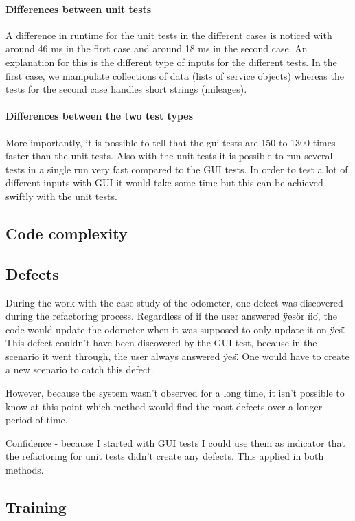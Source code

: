 \documentclass{article}
\begin{document}
			\paragraph{Differences between unit tests}
			A difference in runtime for the unit tests in the different cases is noticed with around 46 ms in the first case and around 18 ms in the second case. An explanation for this is the different type of inputs for the different tests. In the first case, we manipulate collections of data (lists of service objects) whereas the tests for the second case handles short strings (mileages).

			\paragraph{Differences between the two test types}			
			More importantly, it is possible to tell that the gui tests are 150 to 1300 times faster than the unit tests. Also with the unit tests it is possible to run several tests in a single run very fast compared to the GUI tests. In order to test a lot of different inputs with GUI it would take some time but this can be achieved swiftly with the unit tests.

		\subsection{Code complexity}
		
		\subsection{Defects}	
		During the work with the case study of the odometer, one defect was discovered during the refactoring process. Regardless of if the user answered \"yes\" or \"no\", the code would update the odometer when it was supposed to only update it on \"yes\". This defect couldn't have been discovered by the GUI test, because in the scenario it went through, the user always answered \"yes\". One would have to create a new scenario to catch this defect. 

		However, because the system wasn't observed for a long time, it isn't possible to know at this point which method would find the most defects over a longer period of time.

		Confidence - because I started with GUI tests I could use them as indicator that the refactoring for unit tests didn't create any defects. This applied in both methods.

		\subsection{Training}
\end{document}
